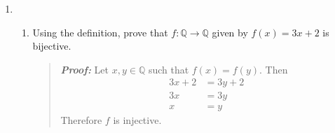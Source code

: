 \documentclass{article}
\newcommand{\Proof}{\textit{\textbf{Proof: }}}
\newcommand{\ZZ}{\mathbb{Z}}
\newcommand{\QQ}{\mathbb{Q}}
\begin{document}
\begin{enumerate}
\begin{enumerate}
\item Establish the following identity using induction.
\[
\sum_{i = 1}^{n}i^{3} = \left(\frac{n(n+1)}{2}\right)^{2}
\]
\begin{quote}
\Proof \\
\textit{\textbf{Base Case: }} $n = 1$
\begin{align*}
\sum_{i = 1}^{1}i^{3} &= \left(\frac{1(1+1)}{2}\right)^{2}\\
1 ^{3} &= \left(\frac{2}{2}\right)^{2}\\
1 &= 1
\end{align*}
\textit{\textbf{Assume: }} $$\sum_{i = 1}^{n}i^{3} = \left(\frac{n(n+1)}{2}\right)^{2}$$
\textit{\textbf{Prove: }}  
\begin{align*}
\sum_{i = 1}^{n + 1}i^{3} &= \left(\frac{(n + 1)(n+2)}{2}\right)^{2}\\
\sum_{i = 1}^{n}i^{3} + \sum_{i = n}^{n + 1}i^{3} &= \left(\frac{(n + 1)(n+2)}{2}\right)^{2}\\
\left(\frac{n(n+1)}{2}\right)^{2} + (n + 1)^{3} &= \left(\frac{(n + 1)(n+2)}{2}\right)^{2}\ \text{By Induction Hypothesis}\\
n^{2}(n+1)^{2} + 4(n+1)^{3} &= (n+1)^{2}(n+2)^{2}\\
(n+1)^{2}(n^{2} + 4n + 4) &= (n+1)^{2}(n+2)^{2}\\
(n+2)^{2} &= (n+2)^{2}
\end{align*}
\end{quote}
$\triangle$
\item Prove that if $n^{3}$ is odd, then $n$ is odd.
\begin{quote}
\Proof Assume that if $n$ is even, then $n^{3}$ is even.
Then $n = 2k$ for $k\in \ZZ$, which mean that $n^{3} = (2k)^{3}$.
$(2k)^{3} = 2(2^{2}k^{3})$ where $(2^{2}k^{3}) \in \ZZ$. Therefore $n^{3}$ is even.
\end{quote}
$\triangle$
\end{enumerate}
\newpage
\item
\begin{enumerate}
\item Using the definition, prove that $f: \QQ \to \QQ$ given by $f(x) = 3x+2$ is bijective.
\begin{quote}
\Proof Let $x,y \in \QQ$ such that $f(x) = f(y)$. Then
\begin{align*}
3x + 2 &= 3y + 2\\
3x &= 3y\\
x &= y
\end{align*}
Therefore $f$ is injective.\\

\end{quote}
\end{enumerate}
\end{enumerate}
\end{document}
